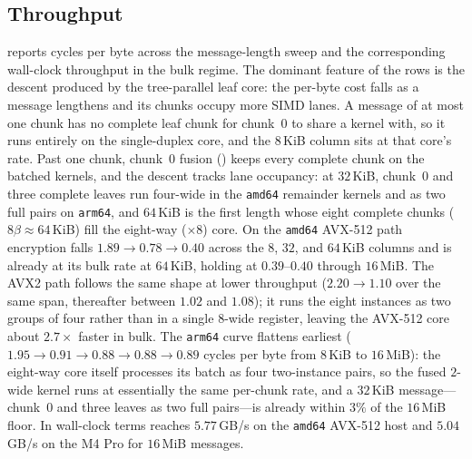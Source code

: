 \subsection{Throughput}
\label{sec:throughput}

 reports cycles per byte across the message-length sweep and
 the corresponding wall-clock throughput in the bulk
regime. The dominant feature of the \TW{} rows is the descent produced by the
tree-parallel leaf core: the per-byte cost falls as a message lengthens and its
chunks occupy more SIMD lanes. A message of at most one chunk has no complete
leaf chunk for chunk~$0$ to share a kernel with, so it runs entirely on the
single-duplex core, and the $8$\,KiB column sits at that core's rate. Past one
chunk, chunk~$0$ fusion () keeps every complete chunk on the
batched kernels, and the descent tracks lane occupancy: at $32$\,KiB, chunk~$0$
and three complete leaves run four-wide in the \texttt{amd64} remainder kernels
and as two full pairs on \texttt{arm64}, and $64$\,KiB is the first length
whose eight complete chunks ($8\beta \approx 64$\,KiB) fill the eight-way
($\times 8$) core. On the \texttt{amd64} AVX-512 path \TW{} encryption falls
$1.89 \to 0.78 \to 0.40$ across the $8$, $32$, and $64$\,KiB columns and is
already at its bulk rate at $64$\,KiB, holding at $0.39$--$0.40$ through
$16$\,MiB. The AVX2 path follows the same shape at lower throughput ($2.20 \to
1.10$ over the same span, thereafter between $1.02$ and $1.08$); it runs the
eight instances as two groups of four rather than in a single $8$-wide
register, leaving the AVX-512 core about $2.7\times$ faster in bulk. The
\texttt{arm64} curve flattens earliest ($1.95 \to 0.91 \to 0.88 \to 0.88 \to
0.89$ cycles per byte from $8$\,KiB to $16$\,MiB): the eight-way core itself
processes its batch as four two-instance pairs, so the fused $2$-wide kernel
runs at essentially the same per-chunk rate, and a $32$\,KiB message---chunk~$0$
and three leaves as two full pairs---is already within $3\%$ of the $16$\,MiB
floor. In wall-clock terms \TW{} reaches $5.77$\,GB/s on the \texttt{amd64}
AVX-512 host and $5.04$\,GB/s on the M4 Pro for $16$\,MiB messages.


